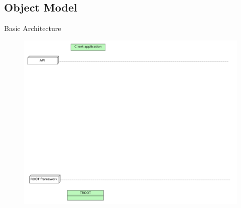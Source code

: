 \subsection{Object Model}
\begin{frame}{Basic Architecture}
  \begin{figure}[htb]
    \centering
      \includegraphics[width=\textwidth, height=.85\textheight, keepaspectratio]{./resources/architecture/architecture_h0.pdf}
  \end{figure}
\end{frame}

